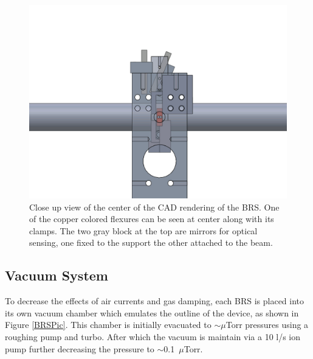 \documentclass [12pt, proquest]{uwthesis}[2019]
\begin{document}
\begin{figure}[!h]
\begin{center} 
\includegraphics[width=\textwidth]{BRSFrontDetail.png}
\end{center}
\caption[Close up view of the center of the CAD rendering of the BRS]{Close up view of the center of the CAD rendering of the BRS. One of the copper colored flexures can be seen at center along with its clamps. The two gray block at the top are mirrors for optical sensing, one fixed to the support the other attached to the beam.} \label{BRSFrontD}
\end{figure}

\subsection{Vacuum System}

To decrease the effects of air currents and gas damping, each BRS is placed into its own vacuum chamber which emulates the outline of the device, as shown in Figure \ref{BRSPic}. This chamber is initially evacuated to $\sim \mu$Torr pressures using a roughing pump and turbo. After which the vacuum is maintain via a 10 l/s ion pump further decreasing the pressure to $\sim$0.1~$\mu$Torr.
\end{document}
